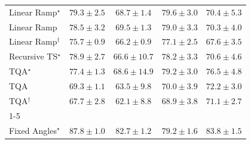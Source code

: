 \begin{tabular}{l|cccc|}
Linear Ramp$^\star$ & {\cellcolor[HTML]{CB4B02}} \color[HTML]{F1F1F1} $79.3\pm 2.5$ & {\cellcolor[HTML]{FEA937}} \color[HTML]{000000} $68.7\pm 1.4$ & {\cellcolor[HTML]{C84A02}} \color[HTML]{F1F1F1} $79.6\pm 3.0$ & {\cellcolor[HTML]{FE9829}} \color[HTML]{000000} $70.4\pm 5.3$ \\
Linear Ramp & {\cellcolor[HTML]{D15205}} \color[HTML]{F1F1F1} $78.5\pm 3.2$ & {\cellcolor[HTML]{FEA030}} \color[HTML]{000000} $69.5\pm 1.3$ & {\cellcolor[HTML]{CD4D03}} \color[HTML]{F1F1F1} $79.0\pm 3.3$ & {\cellcolor[HTML]{FE9829}} \color[HTML]{000000} $70.3\pm 4.0$ \\
Linear Ramp$^\dagger$ & {\cellcolor[HTML]{E56910}} \color[HTML]{F1F1F1} $75.7\pm 0.9$ & {\cellcolor[HTML]{FEC14C}} \color[HTML]{000000} $66.2\pm 0.9$ & {\cellcolor[HTML]{DB5D0B}} \color[HTML]{F1F1F1} $77.1\pm 2.5$ & {\cellcolor[HTML]{FEB340}} \color[HTML]{000000} $67.6\pm 3.5$ \\
Recursive TS$^\star$ & {\cellcolor[HTML]{CE4F03}} \color[HTML]{F1F1F1} $78.9\pm 2.7$ & {\cellcolor[HTML]{FEBD49}} \color[HTML]{000000} $66.6\pm 10.7$ & {\cellcolor[HTML]{D35406}} \color[HTML]{F1F1F1} $78.2\pm 3.3$ & {\cellcolor[HTML]{FD9627}} \color[HTML]{000000} $70.6\pm 4.6$ \\
TQA$^\star$ & {\cellcolor[HTML]{D85A09}} \color[HTML]{F1F1F1} $77.4\pm 1.3$ & {\cellcolor[HTML]{FEAA38}} \color[HTML]{000000} $68.6\pm 14.9$ & {\cellcolor[HTML]{CB4B02}} \color[HTML]{F1F1F1} $79.2\pm 3.0$ & {\cellcolor[HTML]{DF620D}} \color[HTML]{F1F1F1} $76.5\pm 4.8$ \\
TQA & {\cellcolor[HTML]{FEA332}} \color[HTML]{000000} $69.3\pm 1.1$ & {\cellcolor[HTML]{FED471}} \color[HTML]{000000} $63.5\pm 9.8$ & {\cellcolor[HTML]{FE9C2C}} \color[HTML]{000000} $70.0\pm 3.9$ & {\cellcolor[HTML]{F68820}} \color[HTML]{F1F1F1} $72.2\pm 3.0$ \\
TQA$^\dagger$ & {\cellcolor[HTML]{FEB23F}} \color[HTML]{000000} $67.7\pm 2.8$ & {\cellcolor[HTML]{FEDE86}} \color[HTML]{000000} $62.1\pm 8.8$ & {\cellcolor[HTML]{FEA736}} \color[HTML]{000000} $68.9\pm 3.8$ & {\cellcolor[HTML]{FB9225}} \color[HTML]{000000} $71.1\pm 2.7$ \\
\cline{1-5}
\multicolumn{5}{c}{\rule{0pt}{8pt}PP} \\
\midrule
Fixed Angles$^\star$ & {\cellcolor[HTML]{00472A}} \color[HTML]{F1F1F1} $87.8\pm 1.0$ & {\cellcolor[HTML]{076D39}} \color[HTML]{F1F1F1} $82.7\pm 1.2$ & {\cellcolor[HTML]{228343}} \color[HTML]{F1F1F1} $79.2\pm 1.6$ & {\cellcolor[HTML]{006636}} \color[HTML]{F1F1F1} $83.8\pm 1.5$ \\

\end{tabular}
